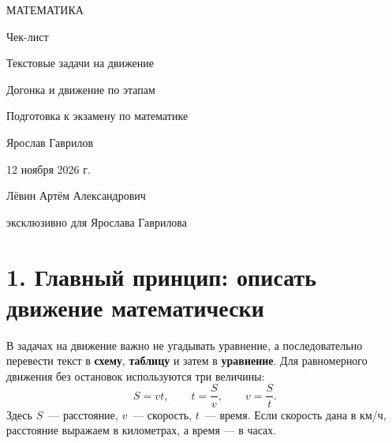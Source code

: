 \documentclass[a4paper,12pt]{article}
\newcommand{\key}[1]{\textcolor{darkaccent}{\textbf{#1}}}
\begin{document}
\thispagestyle{empty}
\begin{center}
\vspace*{27mm}
{\Large\color{darkaccent} МАТЕМАТИКА}\par
\vspace{18mm}
{\Huge\color{textgray} Чек-лист}\par
\vspace{14mm}
{\LARGE\color{accent} Текстовые задачи на движение}\par
\vspace{3mm}
{\Large\color{accent} Догонка и движение по этапам}\par
\vspace{15mm}
{\large Подготовка к экзамену по математике}\par
\vfill
{\large Ярослав Гаврилов}\par
\vspace{10mm}
{\large 12 ноября 2026 г.}\par
\vspace{15mm}
{\normalsize Лёвин Артём Александрович}\par
{\normalsize эксклюзивно для Ярослава Гаврилова}\par
\vspace{13mm}
\end{center}
\clearpage

\section*{1. Главный принцип: описать движение математически}

В задачах на движение важно не угадывать уравнение, а последовательно перевести текст в \key{схему}, \key{таблицу} и затем в \key{уравнение}. Для равномерного движения без остановок используются три величины:
\[
\boxed{S=vt},\qquad \boxed{t=\frac{S}{v}},\qquad \boxed{v=\frac{S}{t}}.
\]
Здесь $S$~--- расстояние, $v$~--- скорость, $t$~--- время. Если скорость дана в км/ч, расстояние выражаем в километрах, а время --- в часах.
\end{document}
